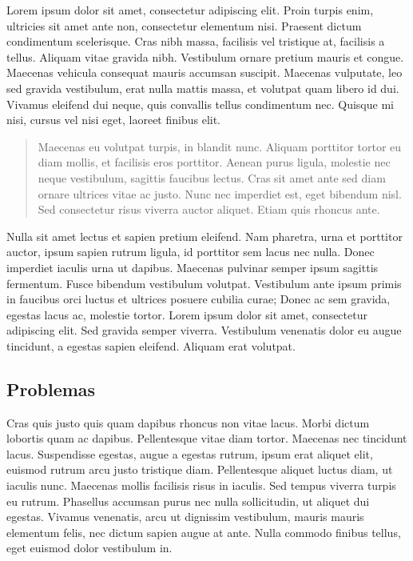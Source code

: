  Lorem ipsum dolor sit amet, consectetur adipiscing elit. Proin turpis enim, ultricies sit amet ante non, consectetur elementum nisi. Praesent dictum condimentum scelerisque. Cras nibh massa, facilisis vel tristique at, facilisis a tellus. Aliquam vitae gravida nibh. Vestibulum ornare pretium mauris et congue. Maecenas vehicula consequat mauris accumsan suscipit. Maecenas vulputate, leo sed gravida vestibulum, erat nulla mattis massa, et volutpat quam libero id dui. Vivamus eleifend dui neque, quis convallis tellus condimentum nec. Quisque mi nisi, cursus vel nisi eget, laoreet finibus elit.
\begin{quote}
Maecenas eu volutpat turpis, in blandit nunc. Aliquam porttitor tortor eu diam mollis, et facilisis eros porttitor. Aenean purus ligula, molestie nec neque vestibulum, sagittis faucibus lectus. Cras sit amet ante sed diam ornare ultrices vitae ac justo. Nunc nec imperdiet est, eget bibendum nisl. Sed consectetur risus viverra auctor aliquet. Etiam quis rhoncus ante.    
\end{quote}

Nulla sit amet lectus et sapien pretium eleifend. Nam pharetra, urna et porttitor auctor, ipsum sapien rutrum ligula, id porttitor sem lacus nec nulla. Donec imperdiet iaculis urna ut dapibus. Maecenas pulvinar semper ipsum sagittis fermentum. Fusce bibendum vestibulum volutpat. Vestibulum ante ipsum primis in faucibus orci luctus et ultrices posuere cubilia curae; Donec ac sem gravida, egestas lacus ac, molestie tortor. Lorem ipsum dolor sit amet, consectetur adipiscing elit. Sed gravida semper viverra. Vestibulum venenatis dolor eu augue tincidunt, a egestas sapien eleifend. Aliquam erat volutpat. \cite{boas2006mathematical}

\subsection{Problemas}
Cras quis justo quis quam dapibus rhoncus non vitae lacus. Morbi dictum lobortis quam ac dapibus. Pellentesque vitae diam tortor. Maecenas nec tincidunt lacus. Suspendisse egestas, augue a egestas rutrum, ipsum erat aliquet elit, euismod rutrum arcu justo tristique diam. Pellentesque aliquet luctus diam, ut iaculis nunc. Maecenas mollis facilisis risus in iaculis. Sed tempus viverra turpis eu rutrum. Phasellus accumsan purus nec nulla sollicitudin, ut aliquet dui egestas. Vivamus venenatis, arcu ut dignissim vestibulum, mauris mauris elementum felis, nec dictum sapien augue at ante. Nulla commodo finibus tellus, eget euismod dolor vestibulum in. 